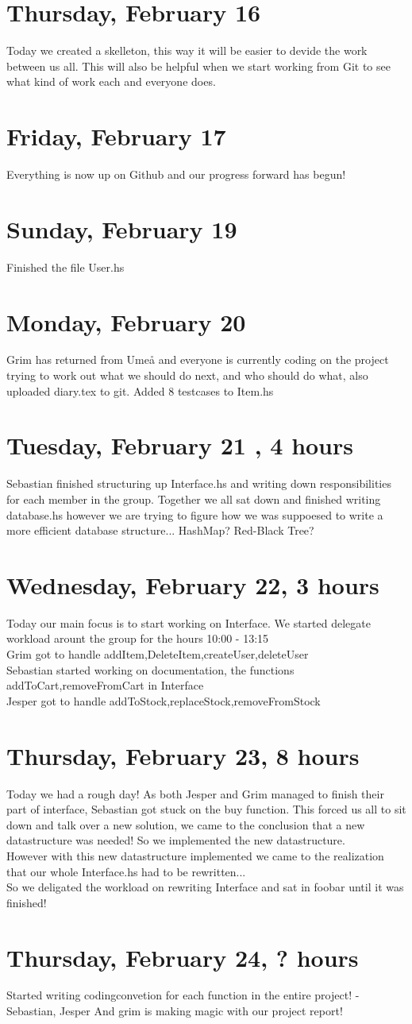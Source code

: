\documentclass[11pt]{article}
\begin{document}
\section*{Thursday, February 16}
Today we created a skelleton, this way it will be easier to devide the work between us all. This will also be helpful when we start working from Git to see what kind of work each and everyone does.

\section*{Friday, February 17}
Everything is now up on Github and our progress forward has begun!
\section*{Sunday, February 19}
Finished the file User.hs
\section*{Monday, February 20}
Grim has returned from Umeå and everyone is currently coding on the project trying to work out what we should do next, and who should do what, also uploaded diary.tex to git. Added 8 testcases to Item.hs
\section*{Tuesday, February 21 , 4 hours }
Sebastian finished structuring up Interface.hs and writing down responsibilities for each member in the group.
Together we all sat down and finished writing database.hs however we are trying to figure how we was suppoesed to write a more efficient database structure... HashMap? Red-Black Tree?
\section*{Wednesday, February 22, 3 hours }
Today our main focus is to start working on Interface. We started delegate workload arount the group for the hours 10:00 - 13:15 \\
Grim got to handle addItem,DeleteItem,createUser,deleteUser \\
Sebastian started working on documentation, the functions addToCart,removeFromCart in Interface \\
Jesper got to handle addToStock,replaceStock,removeFromStock \\
\section*{Thursday, February 23, 8 hours}
Today we had a rough day! As both Jesper and Grim managed to finish their part of interface, Sebastian got stuck on the buy function.
This forced us all to sit down and talk over a new solution, we came to the conclusion that a new datastructure was needed! So we implemented the new datastructure. \\
However with this new datastructure implemented we came to the realization that our whole Interface.hs had to be rewritten...\\
So we deligated the workload on rewriting Interface and sat in foobar until it was finished!
\section*{Thursday, February 24, ? hours}
Started writing codingconvetion for each function in the entire project! - Sebastian, Jesper
And grim is making magic with our project report!
\end{document}
